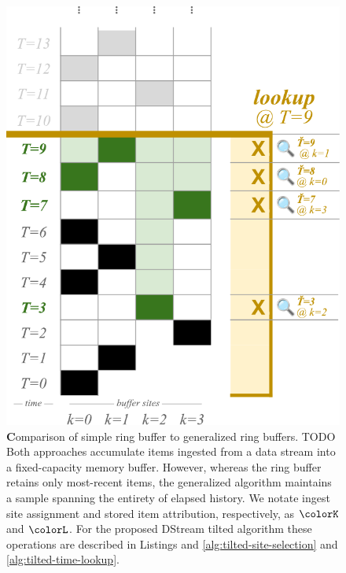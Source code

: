\begin{figure}
{{\begin{minipage}{0.6\linewidth}
\includegraphics[width=\linewidth]{img/ring-buffer-tilted-serif}
\vspace{1ex}
\end{minipage}%
}%
}
\endgroup

\caption{
  {\textbf Comparison of simple ring buffer to generalized ring buffers.}
  \footnotesize
  TODO
  Both approaches accumulate items ingested from a data stream into a fixed-capacity memory buffer.
  However, whereas the ring buffer retains only most-recent items, the generalized algorithm maintains a sample spanning the entirety of elapsed history.
  We notate ingest site assignment and stored item attribution, respectively, as $\colorK$ and $\colorL$.
  For the proposed DStream tilted algorithm these operations are described in Listings and \ref{alg:tilted-site-selection} and \ref{alg:tilted-time-lookup}.
}
\label{fig:curation-ingest-lookup}
\end{figure}
